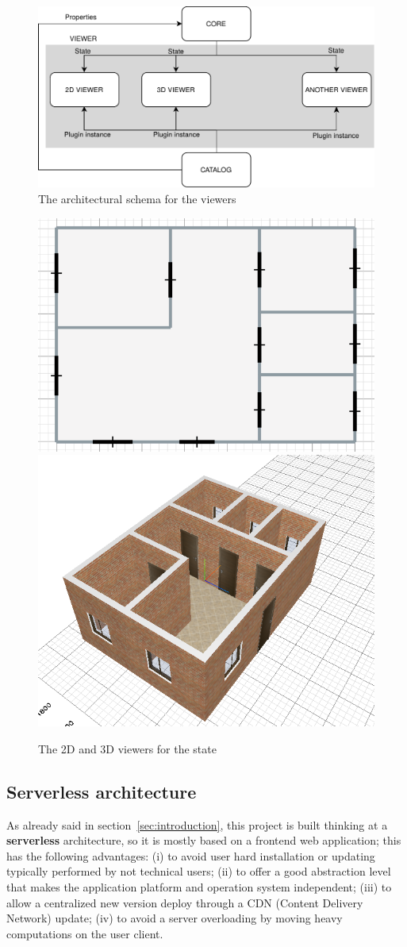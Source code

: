 \begin{figure}[htb]
\centering
\includegraphics[width=\linewidth]{contents/images/diagramma-visualizzatori}

\caption{The architectural schema for the viewers}
\label{fig_viewers}
\end{figure}

\begin{figure}[htb]
\centering
\includegraphics[width=0.45\linewidth]{contents/images/2d-viewer}
\includegraphics[width=0.45\linewidth]{contents/images/3d-viewer}
\caption{The 2D and 3D viewers for the state}
\label{fig_viewer}
\end{figure}

\subsection{Serverless architecture}

As already said in section~\ref{sec:introduction}, this project is built thinking at a \textbf{serverless} architecture, so it is mostly based on a frontend web application; this has the following advantages: (i) to avoid user hard installation or updating typically performed by not technical users; (ii) to offer a good abstraction level that makes the application platform and operation system independent; (iii) to allow a centralized new version deploy through a CDN (Content Delivery Network) update; (iv) to avoid a server overloading by moving heavy computations on the user client.

